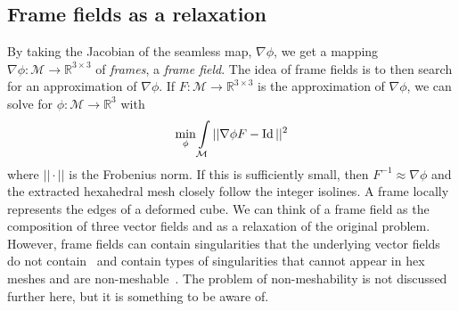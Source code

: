 \documentclass[../thesis.tex]{subfiles}
\begin{document}
\subsection{Frame fields as a relaxation}
By taking the Jacobian of the seamless map, $\nabla \phi$, we get a mapping
$\nabla \phi : \mathcal{M} \to \mathbb{R}^{3\times3}$ of \emph{frames}, a \emph{frame field}.
The idea of frame fields is to then search for an approximation of $\nabla \phi$.
If $F: \mathcal{M} \to \mathbb{R}^{3\times3}$ is the approximation of $\nabla \phi$, we can
solve for $\phi : \mathcal{M} \to \mathbb{R}^3$ with
\begin{equation}\label{eq:poisson}
  \min \limits_{\phi} \int \limits_{\mathcal{M}} ||\nabla \phi F - \Id||^2
\end{equation}
where $||\cdot||$ is the Frobenius norm. If this is sufficiently small, then $F^{-1} \approx \nabla \phi$ and 
the extracted hexahedral mesh closely follow the integer isolines.
A frame locally represents the edges of a deformed cube.
We can think of a frame field as the composition of three vector fields
and as a relaxation of the original problem. However, frame fields
can contain singularities that the underlying vector fields do not contain~\cite{Nieser}
and contain types of singularities that cannot appear in hex meshes and are non-meshable~\cite{Liu}.
The problem of non-meshability is not discussed further here, but it
is something to be aware of.
\end{document}
